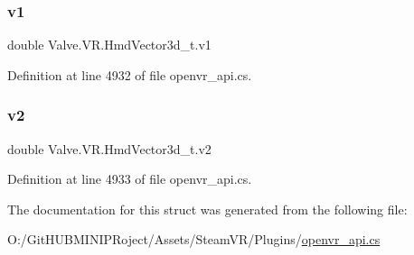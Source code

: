 \subsubsection{\texorpdfstring{v1}{v1}}
{\footnotesize\ttfamily double Valve.\+V\+R.\+Hmd\+Vector3d\+\_\+t.\+v1}



Definition at line 4932 of file openvr\+\_\+api.\+cs.

\mbox{\label{struct_valve_1_1_v_r_1_1_hmd_vector3d__t_a352f2b52154988bcfb77e0b0d3bba5a8}} 
\subsubsection{\texorpdfstring{v2}{v2}}
{\footnotesize\ttfamily double Valve.\+V\+R.\+Hmd\+Vector3d\+\_\+t.\+v2}



Definition at line 4933 of file openvr\+\_\+api.\+cs.



The documentation for this struct was generated from the following file\+:\begin{DoxyCompactItemize}
\item 
O\+:/\+Git\+H\+U\+B\+M\+I\+N\+I\+P\+Roject/\+Assets/\+Steam\+V\+R/\+Plugins/\mbox{\hyperlink{openvr__api_8cs}{openvr\+\_\+api.\+cs}}\end{DoxyCompactItemize}
